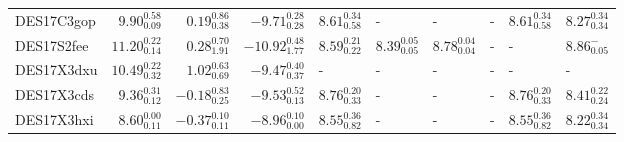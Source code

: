 \documentclass[fleqn,usenatbib,]{mnras}
\begin{document}
\begin{table}
\begin{threeparttable}
\begin{tabular}{lrrrllllll}
DES17C3gop &   $9.90 _{\scriptscriptstyle 0.09} ^{\scriptscriptstyle 0.58}$ &   $0.19 _{\scriptscriptstyle 0.38} ^{\scriptscriptstyle 0.86}$ &   $-9.71 _{\scriptscriptstyle 0.28} ^{\scriptscriptstyle 0.28}$ &  $8.61 _{\scriptscriptstyle 0.58} ^{\scriptscriptstyle 0.34}$ &                                                             - &                                                             - &                                                             - &  $8.61 _{\scriptscriptstyle 0.58} ^{\scriptscriptstyle 0.34}$ &   $8.27 _{\scriptscriptstyle 0.34} ^{\scriptscriptstyle 0.34}$ \\
DES17S2fee &  $11.20 _{\scriptscriptstyle 0.14} ^{\scriptscriptstyle 0.22}$ &   $0.28 _{\scriptscriptstyle 1.91} ^{\scriptscriptstyle 0.70}$ &  $-10.92 _{\scriptscriptstyle 1.77} ^{\scriptscriptstyle 0.48}$ &  $8.59 _{\scriptscriptstyle 0.22} ^{\scriptscriptstyle 0.21}$ &  $8.39 _{\scriptscriptstyle 0.05} ^{\scriptscriptstyle 0.05}$ &  $8.78 _{\scriptscriptstyle 0.04} ^{\scriptscriptstyle 0.04}$ &                                                             - &                                                             - &      $8.86 _{\scriptscriptstyle 0.05} ^{\scriptscriptstyle -}$ \\
DES17X3dxu &  $10.49 _{\scriptscriptstyle 0.32} ^{\scriptscriptstyle 0.22}$ &   $1.02 _{\scriptscriptstyle 0.69} ^{\scriptscriptstyle 0.63}$ &   $-9.47 _{\scriptscriptstyle 0.37} ^{\scriptscriptstyle 0.40}$ &                                                             - &                                                             - &                                                             - &                                                             - &                                                             - &                                                              - \\
DES17X3cds &   $9.36 _{\scriptscriptstyle 0.12} ^{\scriptscriptstyle 0.31}$ &  $-0.18 _{\scriptscriptstyle 0.25} ^{\scriptscriptstyle 0.83}$ &   $-9.53 _{\scriptscriptstyle 0.13} ^{\scriptscriptstyle 0.52}$ &  $8.76 _{\scriptscriptstyle 0.33} ^{\scriptscriptstyle 0.20}$ &                                                             - &                                                             - &                                                             - &  $8.76 _{\scriptscriptstyle 0.33} ^{\scriptscriptstyle 0.20}$ &   $8.41 _{\scriptscriptstyle 0.24} ^{\scriptscriptstyle 0.22}$ \\
DES17X3hxi &   $8.60 _{\scriptscriptstyle 0.11} ^{\scriptscriptstyle 0.00}$ &  $-0.37 _{\scriptscriptstyle 0.11} ^{\scriptscriptstyle 0.10}$ &   $-8.96 _{\scriptscriptstyle 0.00} ^{\scriptscriptstyle 0.10}$ &  $8.55 _{\scriptscriptstyle 0.82} ^{\scriptscriptstyle 0.36}$ &                                                             - &                                                             - &                                                             - &  $8.55 _{\scriptscriptstyle 0.82} ^{\scriptscriptstyle 0.36}$ &   $8.22 _{\scriptscriptstyle 0.34} ^{\scriptscriptstyle 0.34}$ \\

\end{tabular}
\end{threeparttable}
\end{table}
\end{document}
